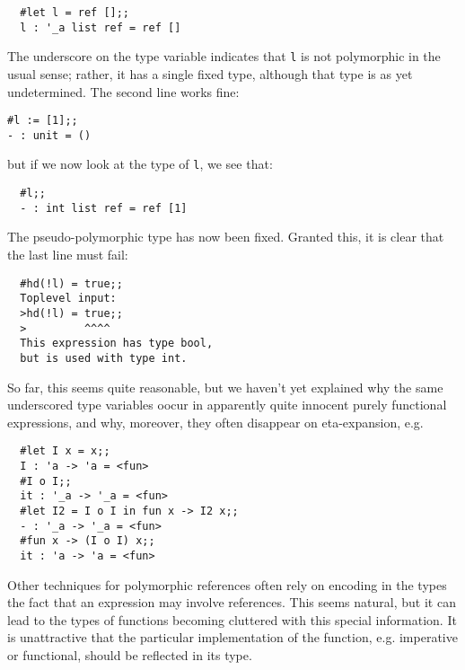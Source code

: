 \begin{boxed}\begin{verbatim}
  #let l = ref [];;
  l : '_a list ref = ref []
\end{verbatim}\end{boxed}

The underscore on the type variable indicates that {\tt l} is not polymorphic
in the usual sense; rather, it has a single fixed type, although that type is
as yet undetermined. The second line works fine:

\begin{boxed}\begin{verbatim}
#l := [1];;
- : unit = ()
\end{verbatim}\end{boxed}

\noindent but if we now look at the type of {\tt l}, we see that:

\begin{boxed}\begin{verbatim}
  #l;;
  - : int list ref = ref [1]
\end{verbatim}\end{boxed}

The pseudo-polymorphic type has now been fixed. Granted this, it is clear that
the last line must fail:

\begin{boxed}\begin{verbatim}
  #hd(!l) = true;;
  Toplevel input:
  >hd(!l) = true;;
  >         ^^^^
  This expression has type bool,
  but is used with type int.
\end{verbatim}\end{boxed}

So far, this seems quite reasonable, but we haven't yet explained why the same
underscored type variables oocur in apparently quite innocent purely functional
expressions, and why, moreover, they often disappear on eta-expansion, e.g.

\begin{boxed}\begin{verbatim}
  #let I x = x;;
  I : 'a -> 'a = <fun>
  #I o I;;
  it : '_a -> '_a = <fun>
  #let I2 = I o I in fun x -> I2 x;;
  - : '_a -> '_a = <fun>
  #fun x -> (I o I) x;;
  it : 'a -> 'a = <fun>
\end{verbatim}\end{boxed}

Other techniques for polymorphic references often rely on encoding in the types
the fact that an expression may involve references. This seems natural, but it
can lead to the types of functions becoming cluttered with this special
information. It is unattractive that the particular implementation of the
function, e.g. imperative or functional, should be reflected in its type.

